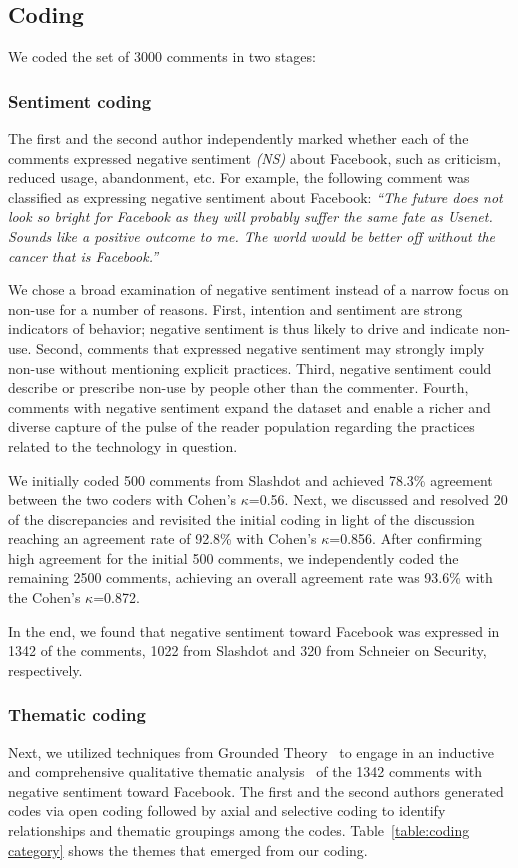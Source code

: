 \subsection{Coding}
We coded the set of 3000 comments in two stages:

\subsubsection{Sentiment coding}
The first and the second author independently marked whether each of the comments expressed negative sentiment \emph{(NS)} about Facebook, such as criticism, reduced usage, abandonment, etc. For example, the following comment was classified as expressing negative sentiment about Facebook: \textit{``The future does not look so bright for Facebook as they will probably suffer the same fate as Usenet. Sounds like a positive outcome to me. The world would be better off without the cancer that is Facebook.''}

We chose a broad examination of negative sentiment instead of a narrow focus on non-use for a number of reasons. First, intention and sentiment are strong indicators of behavior; negative sentiment is thus likely to drive and indicate non-use. Second, comments that expressed negative sentiment may strongly imply non-use without mentioning explicit practices. Third, negative sentiment could describe or prescribe non-use by people other than the commenter. Fourth, comments with negative sentiment expand the dataset and enable a richer and diverse capture of the pulse of the reader population regarding the practices related to the technology in question.

We initially coded 500 comments from Slashdot and achieved 78.3\% agreement between the two coders with Cohen's $\kappa$=0.56. Next, we discussed and resolved 20 of the discrepancies and revisited the initial coding in light of the discussion reaching an agreement rate of 92.8\% with Cohen's $\kappa$=0.856. After confirming high agreement for the initial 500 comments, we independently coded the remaining 2500 comments, achieving an overall agreement rate was 93.6\% with the Cohen's $\kappa$=0.872.

In the end, we found that negative sentiment toward Facebook was expressed in 1342 of the comments, 1022 from Slashdot and 320 from Schneier on Security, respectively.

\subsubsection{Thematic coding}
Next, we utilized techniques from Grounded Theory~\cite{draucker2007theoretical} to engage in an inductive and comprehensive qualitative thematic analysis~\cite{joffe2004content} of the 1342 comments with negative sentiment toward Facebook. The first and the second authors generated codes via open coding followed by axial and selective coding to identify relationships and thematic groupings among the codes. Table~\ref{table:coding category} shows the themes that emerged from our coding.

